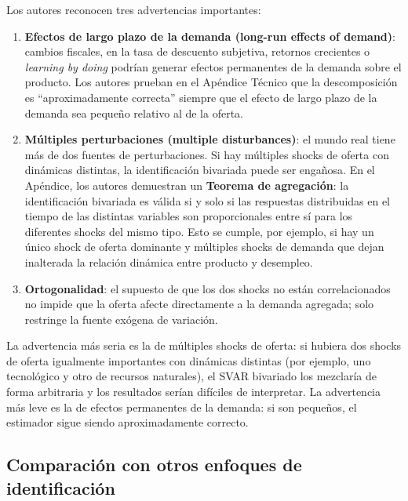 \documentclass[12pt]{article}
\begin{document}
Los autores reconocen tres advertencias importantes:

\begin{enumerate}
  \item \textbf{Efectos de largo plazo de la demanda (long-run effects of demand)}: cambios fiscales, en la tasa de descuento subjetiva, retornos crecientes o \textit{learning by doing} podr\'ian generar efectos permanentes de la demanda sobre el producto. Los autores prueban en el Ap\'endice T\'ecnico que la descomposici\'on es ``aproximadamente correcta'' siempre que el efecto de largo plazo de la demanda sea peque\~no relativo al de la oferta.

  \item \textbf{M\'ultiples perturbaciones (multiple disturbances)}: el mundo real tiene m\'as de dos fuentes de perturbaciones. Si hay m\'ultiples shocks de oferta con din\'amicas distintas, la identificaci\'on bivariada puede ser enga\~nosa. En el Ap\'endice, los autores demuestran un \textbf{Teorema de agregaci\'on}: la identificaci\'on bivariada es v\'alida si y solo si las respuestas distribuidas en el tiempo de las distintas variables son proporcionales entre s\'i para los diferentes shocks del mismo tipo. Esto se cumple, por ejemplo, si hay un \'unico shock de oferta dominante y m\'ultiples shocks de demanda que dejan inalterada la relaci\'on din\'amica entre producto y desempleo.

  \item \textbf{Ortogonalidad}: el supuesto de que los dos shocks no est\'an correlacionados no impide que la oferta afecte directamente a la demanda agregada; solo restringe la fuente ex\'ogena de variaci\'on.
\end{enumerate}

\begin{intuicion}
La advertencia m\'as seria es la de m\'ultiples shocks de oferta: si hubiera dos shocks de oferta igualmente importantes con din\'amicas distintas (por ejemplo, uno tecnol\'ogico y otro de recursos naturales), el SVAR bivariado los mezclar\'ia de forma arbitraria y los resultados ser\'ian dif\'iciles de interpretar. La advertencia m\'as leve es la de efectos permanentes de la demanda: si son peque\~nos, el estimador sigue siendo aproximadamente correcto.
\end{intuicion}

\subsection{Comparaci\'on con otros enfoques de identificaci\'on}
\end{document}
